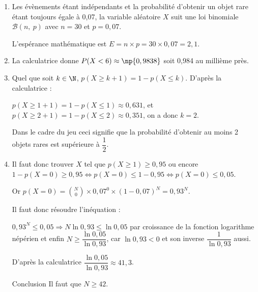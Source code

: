 \begin{enumerate}
\item %
Les évènements étant indépendants et la probabilité d'obtenir un objet rare étant toujours égale à 0,07, la variable aléatoire $X$ suit une loi binomiale $\mathcal{B}(n,\:p)$ avec $n = 30$ et $p = 0,07$.

L'espérance mathématique est $E = n \times p = 30 \times 0,07 = 2,1$.
\item %

La calculatrice donne $P(X < 6) \approx \np{0,9838}$ soit 0,984 au millième près.
\item %
Quel que soit $k \in \N$, \: $p(X \geqslant k + 1) = 1 - p(X \leqslant k)$.
D'après la calculatrice :

$p(X \geqslant 1 + 1) = 1 - p(X \leqslant 1) \approx 0,631$, et $p(X \geqslant 2 + 1) = 1 - p(X \leqslant 2) \approx 0,351$, on a donc $k = 2$.

Dans le cadre du jeu ceci signifie que la probabilité d'obtenir au moins 2 objets rares est supérieure à $\dfrac12$.
\item %

%
Il faut donc trouver $X$ tel que $p(X \geqslant 1) \geqslant 0,95$ ou encore $1 - p(X = 0) \geqslant 0,95 \iff p(X = 0) \leqslant 1 - 0,95 \iff p(X = 0) \leqslant 0,05$.

Or $p(X = 0) = \binom{N}{0} \times 0,07^0 \times (1 - 0,07)^N = 0,93^N$.

Il faut donc résoudre l'inéquation :

$0,93^N \leqslant 0,05 \Rightarrow N \ln 0,93 \leqslant \ln 0,05$ par croissance de la fonction logarithme népérien  et enfin $N \geqslant \dfrac{\ln 0,05}{\ln 0,93}$, car $\ln 0,93 < 0$ et son inverse $\dfrac{1}{\ln 0,93}$ aussi.

D'après la calculatrice $\dfrac{\ln 0,05}{\ln 0,93} \approx 41,3$.

Conclusion Il faut que $N \geqslant 42$.
\end{enumerate}


